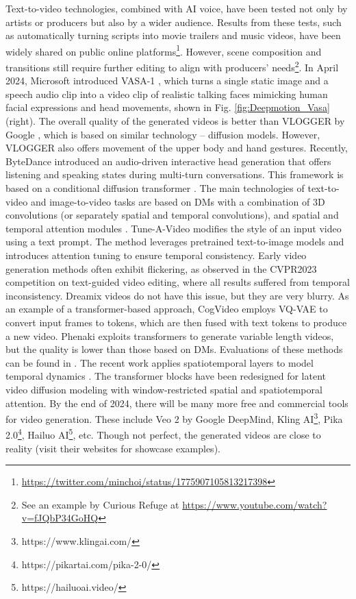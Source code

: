 \documentclass[11pt,a4paper]{article}
\begin{document}
Text-to-video technologies, combined with AI voice, have been tested not only by artists or producers but also by a wider audience. Results from these tests, such as automatically turning scripts into movie trailers and music videos, have been widely shared on public online platforms\footnote{\url{https://twitter.com/minchoi/status/1775907105813217398}}. However, scene composition and transitions still require further editing to align with producers' needs\footnote{See an example by Curious Refuge at \url{https://www.youtube.com/watch?v=fJQbP34GoHQ}}.
In April 2024, Microsoft introduced VASA-1 \cite{xu:VASA-1:2024}, which turns a single static image and a speech audio clip into a video clip of realistic talking faces mimicking human facial expressions and head movements, shown in Fig. \ref{fig:Deepmotion_Vasa} (right). The overall quality of the generated videos is better than VLOGGER by Google \cite{corona:vlogger:2024}, which is based on similar technology -- diffusion models. However, VLOGGER also offers movement of the upper body and hand gestures. Recently, ByteDance introduced an audio-driven interactive head generation \cite{Zhu:INFP:2024} that offers listening and speaking states during multi-turn conversations. This framework is based on a conditional diffusion transformer
.
The main technologies of text-to-video and image-to-video tasks are based on DMs with a combination of 3D convolutions (or separately spatial and temporal convolutions), and spatial and temporal attention modules \cite{wang:modelscope:2023}. Tune-A-Video \cite{wu:tune:2023} modifies the style of an input video using a text prompt. The method leverages pretrained text-to-image models and introduces attention tuning to ensure temporal consistency. Early video generation methods often exhibit flickering, as observed in the CVPR2023 competition on text-guided video editing, where all results suffered from temporal inconsistency. Dreamix \cite{molad:dreamix:2023} videos do not have this issue, but they are very blurry. As an example of a transformer-based approach, CogVideo \cite{hong:cogvideo:2023} employs VQ-VAE to convert input frames to tokens, which are then fused with text tokens to produce a new video. Phenaki \cite{villegas:phenaki:2023} exploits transformers to generate variable length videos, but the quality is lower than those based on DMs. Evaluations of these methods can be found in \cite{Liu:FETV:2023}. The recent work applies spatiotemporal layers to model temporal dynamics \cite{Gupta:Photorealistic:2024}. The transformer blocks have been redesigned for latent video diffusion modeling with window-restricted spatial and spatiotemporal attention. By the end of 2024, there will be many more free and commercial tools for video generation. These include Veo 2 by Google DeepMind, Kling AI\footnote{https://www.klingai.com/}, Pika 2.0\footnote{https://pikartai.com/pika-2-0/}, Hailuo AI\footnote{https://hailuoai.video/}, etc. Though not perfect, the generated videos are close to reality (visit their websites for showcase examples).
\end{document}
